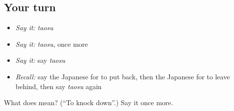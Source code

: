 \subsection*{Your turn}
\begin{itemize}
\raggedright
  \item \emph{Say it:} \emph{taosu}
  \item \emph{Say it:} \emph{taosu}, once more
  \item \emph{Say it:} say \emph{taosu}
  \item \emph{Recall:} say the Japanese for to put back, then the Japanese for to leave behind, then say \emph{taosu} again
\end{itemize}

\begin{tcolorbox}[breakable,colback=teal!4,colframe=teal!35!black,title={Before you move on}]
What does  mean? (\textquotedblleft{}To knock down\textquotedblright{}.) Say it once more.
\end{tcolorbox}

